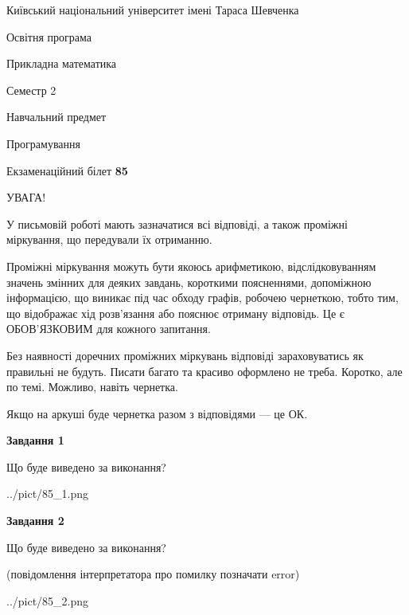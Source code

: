 \documentclass[12pt, ukrainian]{article}
\begin{document}
{{\begin {small}\par
{ \center  Київський національний університет імені Тараса Шевченка \par}
{\parbox {5 cm}{Освітня програма \hfill}{\parbox {7 cm}{Прикладна математика\hfill}}\parbox {6 cm}{\hfill Семестр 2}}\par
{\parbox {5 cm} {Навчальний предмет \hfill}\parbox {7 cm}{Програмування \hfill}\parbox {6cm}{\hfill}\par}\vspace{-7pt} \end{small}}{\center Екзаменаційний білет \No \textbf
{ 85 }\par}}
{
\begin {large}
УВАГА!

У письмовій роботі мають зазначатися всі відповіді, а також проміжні міркування, що передували їх отриманню.

Проміжні міркування можуть бути якоюсь арифметикою, відслідковуванням зна\-чень змінних для деяких завдань,
короткими поясненнями, допоміжною інформацією, що виникає під час обходу графів, робочею чернеткою,
тобто тим, що відображає хід розв’язання або пояснює отриману відповідь.
Це є ОБОВ’ЯЗКОВИМ для кожного запитання.

Без наявності доречних проміжних міркувань відповіді зараховуватись як правиль\-ні не будуть.
Писати багато та красиво оформлено не треба. Коротко, але по темі. Можли\-во, навіть чернетка.

Якщо на аркуші буде чернетка разом з відповідями --- це ОК.

\newpage

{\begin {center}\textbf{Завдання 1}\end {center}}\par
Що буде виведено за виконання?\par
\begin{center}
	{../pict/85_1.png}
\end{center}
\newpage

{\begin {center}\textbf{Завдання 2}\end {center}}\par
Що буде виведено за виконання?\par
 (повідомлення інтерпретатора про помилку позначати error)\par
\begin{center}
	{../pict/85_2.png}
\end{center}
\newpage


\end{large}}
\end{document}
